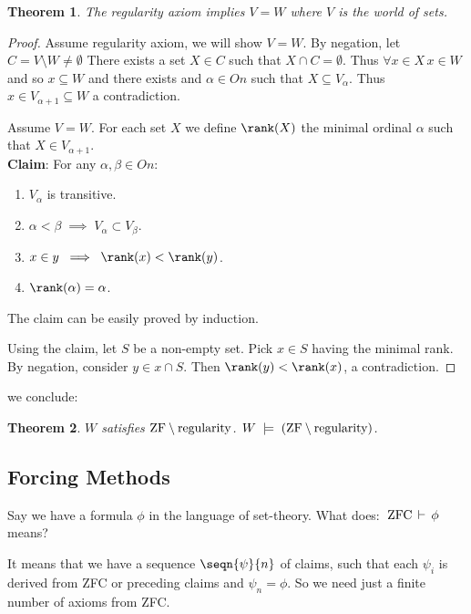 \documentclass[11pt,pdftex,twoside,a4paper]{article}
\newcommand{\B}[1]{\textbf{#1}}
\newcommand{\On}{\ensuremath{\mathit{On}}}
\newtheorem{thm}{Theorem}[section]
\theoremstyle{definition}
\begin{document}
\begin{thm}
The regularity axiom implies \(V=W\) where $V$ is the world of sets.
\end{thm}
\begin{proof}
Assume regularity axiom, we will show \(V=W\).
By negation, let \(C = V \setminus W\neq \emptyset\)
There exists a set \(X \in C\) such that \(X \cap C = \emptyset\).
Thus \(\forall x\in X\, x\in W\) and so \(x \subseteq W\) and
there exists and \(\alpha\in \On\) such that \(X\subseteq V_\alpha\).
Thus \(x\in V_{\alpha+1} \subseteq W\) a contradiction.

Assume \(V=W\). For each set $X$ we define \(\rank(X)\)
the minimal ordinal \(\alpha\) such that \(X\in V_{\alpha+1}\).
\\
\B{Claim}: For any \(\alpha,\beta\in\On\):
\begin{enumerate}
\item \(V_\alpha\) is transitive.
\item \(\alpha < \beta \;\implies\; V_\alpha \subset V_\beta\).
\item \(x\in y\;\implies\; \rank(x) < \rank(y)\).
\item \(\rank(\alpha) = \alpha\).
\end{enumerate}
The claim can be easily proved by induction.

Using the claim, let $S$ be a non-empty set.
Pick \(x\in S\) having the minimal rank.
By negation, consider \(y \in x \cap S\).
Then \(\rank(y)<\rank(x)\), a contradiction.
\end{proof}

we conclude:
\begin{thm}
$W$ satisfies \(\textnormal{ZF} \setminus \textnormal{regularity}\).
\(W \;\models\; (\textnormal{ZF} \setminus \textnormal{regularity})\).
\end{thm}

\subsection{Forcing Methods}

Say we have a formula \(\phi\) in the language of set-theory.
What does: \(\;\textnormal{ZFC}\,\vdash\,\phi\;\) means?

It means that we have a sequence \(\seqn{\psi}{n}\) of claims,
such that each \(\psi_i\) is derived from ZFC or preceding claims
and \(\psi_n = \phi\).
So we need just a finite number of axioms from ZFC.
\end{document}
